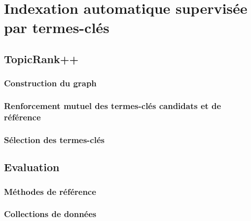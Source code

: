 
  \section{Indexation automatique supervisée par termes-clés}
  \label{sec:main-automatic_keyphrase_annotation-supervised_automatic_keyphrase_extraction}
    \subsection{TopicRank++}
    \label{subsec:main-automatic_keyphrase_annotation-supervised_automatic_keyphrase_annotation-topicrank++}
      \subsubsection{Construction du graph}
      \label{subsubsec:main-automatic_keyphrase_annotation-supervised_automatic_keyphrase_extraction-topicrank++-graph_construction}

      \subsubsection{Renforcement mutuel des termes-clés candidats et de référence}
      \label{subsubsec:main-automatic_keyphrase_annotation-supervised_automatic_keyphrase_extraction-topicrank++-mutual_reinforcement}

      \subsubsection{Sélection des termes-clés}
      \label{subsubsec:main-automatic_keyphrase_annotation-supervised_automatic_keyphrase_extraction-topicrank++-keyphrase_selection}

    \subsection{Evaluation}
    \label{subsec:main-automatic_keyphrase_annotation-supervised_automatic_keyphrase_annotation-evaluation}
      \subsubsection{Méthodes de référence}
      \label{subsubsec:main-automatic_keyphrase_annotation-supervised_automatic_keyphrase_annotation-evaluation-baselines}

      \subsubsection{Collections de données}
      \label{subsubsec:main-automatic_keyphrase_annotation-supervised_automatic_keyphrase_annotation-evaluation-evaluation_data}

